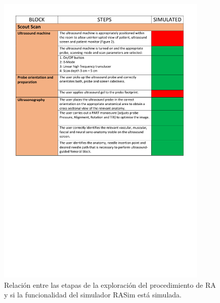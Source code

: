 %  
% 
% 
\begin{figure}[ht]
    \centering
    \includegraphics[trim={1cm 13cm 1cm 1cm},clip,width=0.9\textwidth]{PDFs/RA1.pdf}
       \caption{Relación entre las etapas de la exploración del procedimiento de \acs{RA} y si la funcionalidad del simulador \acs{RASim} está simulada.\label{fig:RAsteps1} }
    
\end{figure}

